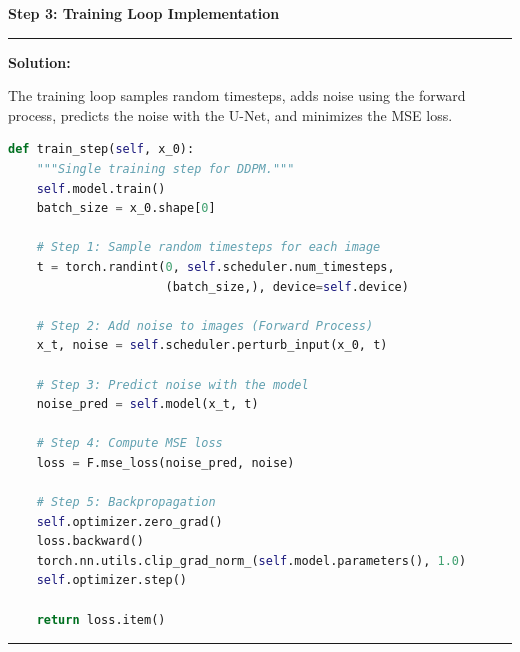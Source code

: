 \documentclass[a4paper,12pt]{article}
\newenvironment{solutionbox}{
    \par
    \vspace{0.5em}
    \noindent
    {\color{primary}\rule{\linewidth}{0.4pt}}
    \par\smallskip
    \noindent\textbf{\color{primary}Solution:}
    \par\smallskip
    \small
}{
    \par\smallskip
    {\color{primary}\rule{\linewidth}{0.4pt}}
    \par\vspace{0.5em}
}
\begin{document}
\textbf{Step 3: Training Loop Implementation}
\begin{solutionbox}
    The training loop samples random timesteps, adds noise using the forward process, predicts the noise with the U-Net, and minimizes the MSE loss.
    
\begin{lstlisting}[language=Python]
def train_step(self, x_0):
    """Single training step for DDPM."""
    self.model.train()
    batch_size = x_0.shape[0]
    
    # Step 1: Sample random timesteps for each image
    t = torch.randint(0, self.scheduler.num_timesteps, 
                      (batch_size,), device=self.device)
    
    # Step 2: Add noise to images (Forward Process)
    x_t, noise = self.scheduler.perturb_input(x_0, t)
    
    # Step 3: Predict noise with the model
    noise_pred = self.model(x_t, t)
    
    # Step 4: Compute MSE loss
    loss = F.mse_loss(noise_pred, noise)
    
    # Step 5: Backpropagation
    self.optimizer.zero_grad()
    loss.backward()
    torch.nn.utils.clip_grad_norm_(self.model.parameters(), 1.0)
    self.optimizer.step()
    
    return loss.item()
\end{lstlisting}
\end{solutionbox}
\end{document}
